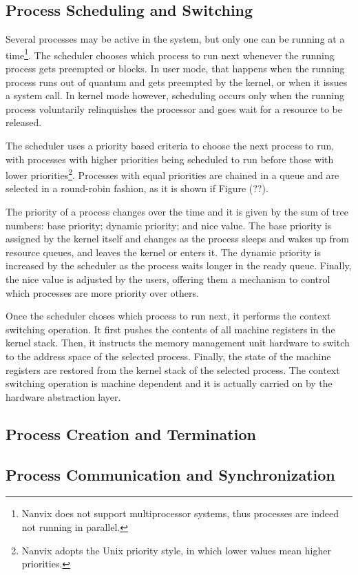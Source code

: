 \documentclass[10pt,a4paper]{article}
\begin{document}
\subsection{Process Scheduling and Switching}

Several processes may be active in the system, but only one can be running at a time\footnote{Nanvix does not support multiprocessor systems, thus processes are indeed not running in parallel.}. The scheduler chooses which process to run next whenever the running process gets preempted or blocks. In user mode, that happens when the running process runs out of quantum and gets preempted by the kernel, or when it issues a system call. In kernel mode however, scheduling occurs only when the running process voluntarily relinquishes the processor and goes wait for a resource to be released.

The scheduler uses a priority based criteria to choose the next process to run, with processes with higher priorities being scheduled to run before those with lower priorities\footnote{Nanvix adopts the Unix priority style, in which lower values mean higher priorities.}. Processes with equal priorities are chained in a queue and are selected in a round-robin fashion, as it is shown if Figure (??).

The priority of a process changes over the time and it is given by the sum of tree numbers: base priority; dynamic priority; and nice value. The base priority is assigned by the kernel itself and changes as the process sleeps and wakes up from resource queues, and leaves the kernel or enters it. The dynamic priority is increased by the scheduler as the process waits longer in the ready queue. Finally, the nice value is adjusted by the users, offering them a mechanism to control which processes are more priority over others.

Once the scheduler choses which process to run next, it performs the context switching operation. It first pushes the contents of all machine registers in the kernel stack. Then, it instructs the memory management unit hardware to switch to the address space of the selected process. Finally, the state of the machine registers are restored from the kernel stack of the selected process. The context switching operation is machine dependent and it is actually carried on by the hardware abstraction layer.

\subsection{Process Creation and Termination}

\subsection{Process Communication and Synchronization}
\end{document}
